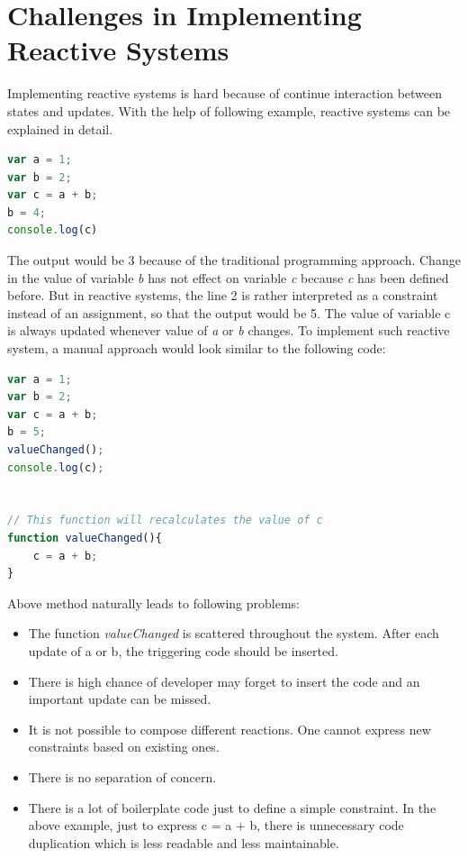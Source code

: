 \section {Challenges in Implementing Reactive Systems}
Implementing reactive systems is hard because of continue interaction between states and updates. With the help of following example, reactive systems can be explained in detail.

\begin{lstlisting}[language=JavaScript, caption=Sample example 1, label={lst:sample-example-1}]
var a = 1;
var b = 2;
var c = a + b;
b = 4;
console.log(c)
\end{lstlisting}
The output would be 3 because of the traditional programming approach. Change in the value of variable \textit{b} has not effect on variable \textit{c} because \textit{c} has been defined before. But in reactive systems, the line 2 is rather interpreted as a constraint instead of an assignment, so that the output would be 5. The value of variable c is always updated whenever value of \textit{a} or \textit{b} changes. 
To implement such reactive system, a manual approach would look similar to the following code:
\begin{lstlisting}[language=JavaScript, caption=Sample example 2, label={lst:sample-example-2}]
var a = 1;
var b = 2;
var c = a + b;
b = 5;
valueChanged();
console.log(c);


// This function will recalculates the value of c
function valueChanged(){
	c = a + b;
}
\end{lstlisting}
Above method naturally leads to following problems:

\begin{itemize}
	
	\item The function \textit{valueChanged} is scattered throughout the system. After each update of a or b, the triggering code should be inserted.
	\item There is high chance of developer may forget to insert the code and an important update can be missed.
	\item It is not possible to compose different reactions. One cannot express new constraints based on existing ones.
	\item There is no separation of concern.
	\item There is a lot of boilerplate code just to define a simple constraint. In the above example, just to express c = a + b, there is unnecessary code duplication which is less readable and less maintainable.
\end{itemize}
	
